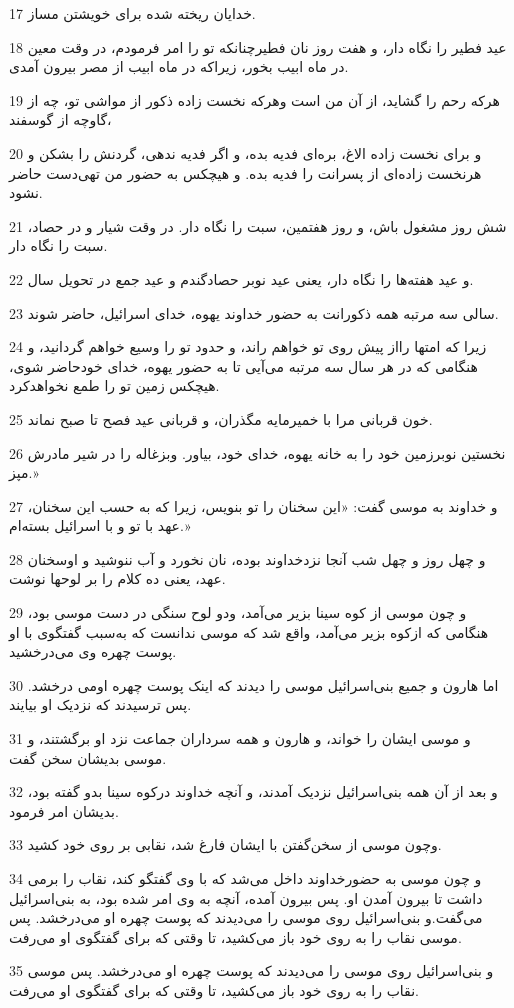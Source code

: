 \par 17 خدایان ریخته شده برای خویشتن مساز.
\par 18 عید فطیر را نگاه دار، و هفت روز نان فطیرچنانکه تو را امر فرمودم، در وقت معین در ماه ابیب بخور، زیراکه در ماه ابیب از مصر بیرون آمدی.
\par 19 هر‌که رحم را گشاید، از آن من است وهر‌که نخست زاده ذکور از مواشی تو، چه از گاوچه از گوسفند،
\par 20 و برای نخست زاده الاغ، بره‌ای فدیه بده، و اگر فدیه ندهی، گردنش را بشکن و هرنخست زاده‌ای از پسرانت را فدیه بده. و هیچکس به حضور من تهی‌دست حاضر نشود.
\par 21 شش روز مشغول باش، و روز هفتمین، سبت را نگاه دار. در وقت شیار و در حصاد، سبت را نگاه دار.
\par 22 و عید هفته‌ها را نگاه دار، یعنی عید نوبر حصادگندم و عید جمع در تحویل سال.
\par 23 سالی سه مرتبه همه ذکورانت به حضور خداوند یهوه، خدای اسرائیل، حاضر شوند.
\par 24 زیرا که امتها رااز پیش روی تو خواهم راند، و حدود تو را وسیع خواهم گردانید، و هنگامی که در هر سال سه مرتبه می‌آیی تا به حضور یهوه، خدای خودحاضر شوی، هیچکس زمین تو را طمع نخواهدکرد.
\par 25 خون قربانی مرا با خمیرمایه مگذران، و قربانی عید فصح تا صبح نماند.
\par 26 نخستین نوبرزمین خود را به خانه یهوه، خدای خود، بیاور. وبزغاله را در شیر مادرش مپز.»
\par 27 و خداوند به موسی گفت: «این سخنان را تو بنویس، زیرا که به حسب این سخنان، عهد با تو و با اسرائیل بسته‌ام.»
\par 28 و چهل روز و چهل شب آنجا نزدخداوند بوده، نان نخورد و آب ننوشید و اوسخنان عهد، یعنی ده کلام را بر لوحها نوشت.
\par 29 و چون موسی از کوه سینا بزیر می‌آمد، ودو لوح سنگی در دست موسی بود، هنگامی که ازکوه بزیر می‌آمد، واقع شد که موسی ندانست که به‌سبب گفتگوی با او پوست چهره وی می‌درخشید.
\par 30 اما هارون و جمیع بنی‌اسرائیل موسی را دیدند که اینک پوست چهره اومی درخشد. پس ترسیدند که نزدیک او بیایند.
\par 31 و موسی ایشان را خواند، و هارون و همه سرداران جماعت نزد او برگشتند، و موسی بدیشان سخن گفت.
\par 32 و بعد از آن همه بنی‌اسرائیل نزدیک آمدند، و آنچه خداوند درکوه سینا بدو گفته بود، بدیشان امر فرمود.
\par 33 وچون موسی از سخن‌گفتن با ایشان فارغ شد، نقابی بر روی خود کشید.
\par 34 و چون موسی به حضورخداوند داخل می‌شد که با وی گفتگو کند، نقاب را برمی داشت تا بیرون آمدن او. پس بیرون آمده، آنچه به وی امر شده بود، به بنی‌اسرائیل می‌گفت.و بنی‌اسرائیل روی موسی را می‌دیدند که پوست چهره او می‌درخشد. پس موسی نقاب را به روی خود باز می‌کشید، تا وقتی که برای گفتگوی او می‌رفت.
\par 35 و بنی‌اسرائیل روی موسی را می‌دیدند که پوست چهره او می‌درخشد. پس موسی نقاب را به روی خود باز می‌کشید، تا وقتی که برای گفتگوی او می‌رفت.
 
